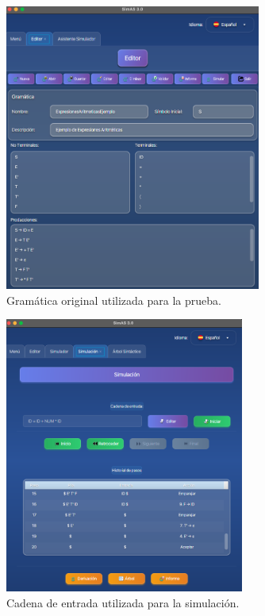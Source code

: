 \needspace{6cm}
\begin{figure}[H]
  \centering
  \includegraphics[width=0.75\textwidth]{figuras2/pruebas/simulador/gramatica.png}
  \caption{Gramática original utilizada para la prueba.}
\end{figure}

\needspace{6cm}
\begin{figure}[H]
  \centering
  \includegraphics[width=0.7\textwidth]{figuras2/pruebas/simulador/cadena_entrada.png}
  \caption{Cadena de entrada utilizada para la simulación.}
\end{figure}

